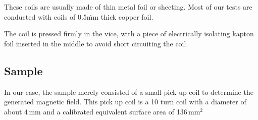These coils are usually made of thin metal foil or sheeting. Most of our 
tests are conducted with coils of 0.5\.mm thick copper foil.

The coil is pressed firmly in the vice, with a piece of electrically 
isolating kapton foil inserted in the middle to avoid short circuiting the 
coil.

\subsection{Sample}
In our case, the sample merely consisted of a small pick up coil to 
determine the generated magnetic field. This pick up coil is a 10 turn coil 
with a diameter of about 4\,mm and a calibrated equivalent surface area of 
136\,mm$^2$
